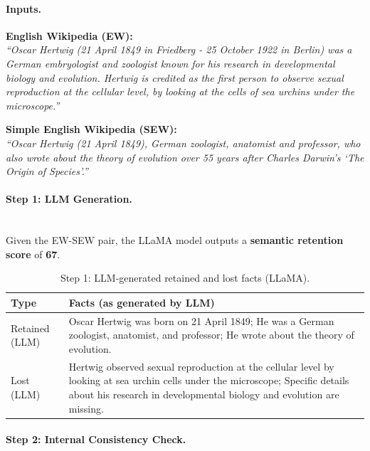 \documentclass{DESSThesis}
\begin{document}
\paragraph{Inputs.}
\textbf{English Wikipedia (EW):}\\
\textit{“Oscar Hertwig (21 April 1849 in Friedberg - 25 October 1922 in Berlin) was a German embryologist and zoologist known for his research in developmental biology and evolution. Hertwig is credited as the first person to observe sexual reproduction at the cellular level, by looking at the cells of sea urchins under the microscope.”}

\noindent
\textbf{Simple English Wikipedia (SEW):}\\
\textit{“Oscar Hertwig (21 April 1849), German zoologist, anatomist and professor, who also wrote about the theory of evolution over 55 years after Charles Darwin's ‘The Origin of Species’.”}

\paragraph{Step 1: LLM Generation.}\\

Given the EW-SEW pair, the LLaMA model outputs a \textbf{semantic retention score} of \textbf{67}.

\begin{table}[H]
\centering
\caption{Step 1: LLM-generated retained and lost facts (LLaMA).}
\label{tab:llm_lists_hertwig}
\renewcommand{\arraystretch}{1.2}
\setlength{\tabcolsep}{6pt}
\begin{tabularx}{\textwidth}{lX}
\toprule
\textbf{Type} & \textbf{Facts (as generated by LLM)} \\
\midrule
Retained (LLM) &
Oscar Hertwig was born on 21 April 1849; He was a German zoologist, anatomist, and professor; He wrote about the theory of evolution. \\
Lost (LLM) &
Hertwig observed sexual reproduction at the cellular level by looking at sea urchin cells under the microscope; Specific details about his research in developmental biology and evolution are missing. \\
\bottomrule
\end{tabularx}
\end{table}

\paragraph{Step 2: Internal Consistency Check.}\\
\end{document}
